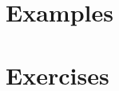 \documentclass[../main-exe.tex]{subfiles}
\begin{document}
\section{Examples}

\section{Exercises}
\end{document}
